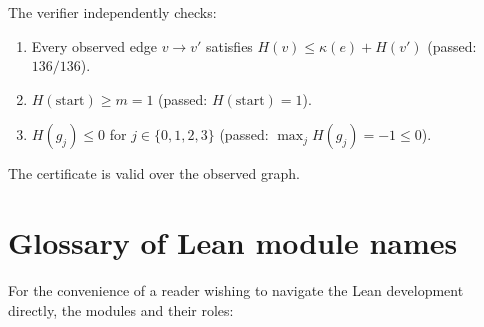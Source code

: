 \documentclass[11pt,a4paper]{article}
\theoremstyle{plain}
\theoremstyle{definition}
\begin{document}
\noindent The verifier independently checks:
\begin{enumerate}
   \item Every observed edge $v \to v'$ satisfies
         $H(v) \le \kappa(e) + H(v')$ (passed: $136/136$).
   \item $H(\text{start}) \ge m = 1$ (passed: $H(\text{start}) = 1$).
   \item $H(g_j) \le 0$ for $j \in \{0, 1, 2, 3\}$ (passed:
         $\max_j H(g_j) = -1 \le 0$).
\end{enumerate}
The certificate is valid over the observed graph.

\section{Glossary of Lean module names}\label{app:lean-modules}

For the convenience of a reader wishing to navigate the Lean
development directly, the modules and their roles:
\end{document}

